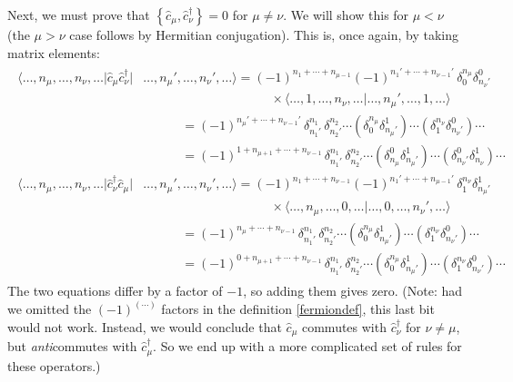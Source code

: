 \documentclass[prx,12pt]{revtex4-2}
\begin{document}
Next, we must prove that $\left\{ \hat{c}_\mu,
\hat{c}_\nu^\dagger\right\} = 0$ for $\mu \ne \nu$.  We will show this
for $\mu < \nu$ (the $\mu > \nu$ case follows by Hermitian
conjugation).  This is, once again, by taking matrix elements:
\begin{align*}
  \begin{aligned}\big\langle \dots,n_\mu,\dots, n_\nu,\dots \big| \hat{c}_\mu \hat{c}_\nu^\dagger \big| & \dots, n_\mu', \dots, n_\nu',\dots\big\rangle = (-1)^{n_1+\cdots+n_{\mu-1}} (-1)^{n_1'+\cdots+n_{\nu-1}'} \,\delta^{n_\mu}_0 \delta^0_{n_\nu'} \\ &\qquad\qquad\qquad\qquad\qquad\times \big\langle \dots, 1, \dots, n_\nu,\dots\big| \dots,n_{\mu}', \dots,1, \dots \big\rangle \\ &\qquad\quad = (-1)^{n_\mu'+\cdots+n_{\nu-1}'}\, \delta^{n_1}_{n_1'} \, \delta^{n_2}_{n_2'} \cdots \left(\delta^{n_\mu}_0\delta^1_{n_\mu'}\right) \cdots \left(\delta^{n_\nu}_1 \delta^0_{n_\nu'}\right) \cdots \\
&\qquad\quad = (-1)^{1 + n_{\mu+1} + \cdots+n_{\nu-1}}\, \delta^{n_1}_{n_1'} \, \delta^{n_2}_{n_2'} \cdots \left(\delta^0_{n_\mu}\delta^1_{n_\mu'}\right) \cdots \left(\delta^0_{n_\nu'} \delta^1_{n_\nu}\right) \cdots \\
  \big\langle \dots,n_\mu,\dots, n_\nu,\dots \big| \hat{c}_\nu^\dagger \hat{c}_\mu \big| &\dots, n_\mu', \dots, n_\nu',\dots\big\rangle = (-1)^{n_1+\cdots+n_{\nu-1}} (-1)^{n_1'+\cdots+n_{\mu-1}'} \,\delta^{n_\nu}_1 \delta^1_{n_\mu'} \\ &\qquad\qquad\qquad\qquad\qquad\times \big\langle \dots, n_\mu, \dots, 0,\dots\big| \dots,0, \dots,n_\nu', \dots \big\rangle \\ &\qquad\quad= (-1)^{n_{\mu}+\cdots+n_{\nu-1}}\, \delta^{n_1}_{n_1'} \, \delta^{n_2}_{n_2'} \cdots \left(\delta^{n_\mu}_0\delta^1_{n_\mu'}\right) \cdots \left(\delta^{n_\nu}_1 \delta^0_{n_\nu'} \right) \cdots \\ &\qquad\quad= (-1)^{0 + n_{\mu+1}+\cdots+n_{\nu-1}}\, \delta^{n_1}_{n_1'} \, \delta^{n_2}_{n_2'} \cdots \left(\delta^{n_\mu}_0\delta^1_{n_\mu'}\right) \cdots \left(\delta^{n_\nu}_1\delta^0_{n_\nu'}\right) \cdots
  \end{aligned}
\end{align*}
The two equations differ by a factor of $-1$, so adding them gives
zero.  (Note: had we omitted the $(-1)^{(\cdots)}$ factors in the
definition \eqref{fermiondef}, this last bit would not work.  Instead,
we would conclude that $\hat{c}_\mu$ commutes with
$\hat{c}_\nu^\dagger$ for $\nu \ne \mu$, but \textit{anti}commutes
with $\hat{c}_\mu^\dagger$.  So we end up with a more complicated set
of rules for these operators.)
\end{document}
